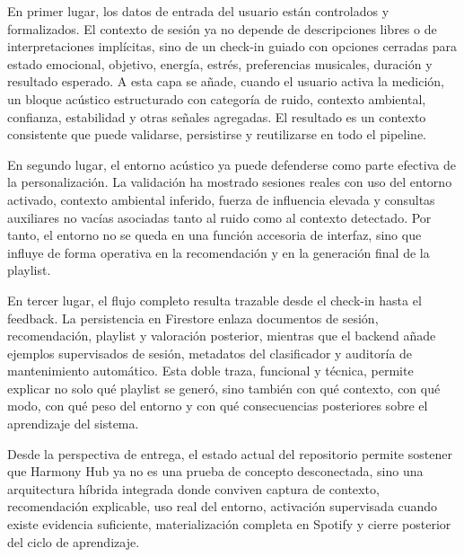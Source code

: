 En primer lugar, los datos de entrada del usuario están controlados y
formalizados. El contexto de sesión ya no depende de descripciones libres o de
interpretaciones implícitas, sino de un check-in guiado con opciones cerradas
para estado emocional, objetivo, energía, estrés, preferencias musicales,
duración y resultado esperado. A esta capa se añade, cuando el usuario activa
la medición, un bloque acústico estructurado con categoría de ruido, contexto
ambiental, confianza, estabilidad y otras señales agregadas. El resultado es un
contexto consistente que puede validarse, persistirse y reutilizarse en todo el
pipeline.

En segundo lugar, el entorno acústico ya puede defenderse como parte efectiva
de la personalización. La validación ha mostrado sesiones reales con uso del
entorno activado, contexto ambiental inferido, fuerza de influencia elevada y
consultas auxiliares no vacías asociadas tanto al ruido como al contexto
detectado. Por tanto, el entorno no se queda en una función accesoria de
interfaz, sino que influye de forma operativa en la recomendación y en la
generación final de la playlist.

En tercer lugar, el flujo completo resulta trazable desde el check-in hasta el
feedback. La persistencia en Firestore enlaza documentos de sesión,
recomendación, playlist y valoración posterior, mientras que el backend añade
ejemplos supervisados de sesión, metadatos del clasificador y auditoría de
mantenimiento automático. Esta doble traza, funcional y técnica, permite
explicar no solo qué playlist se generó, sino también con qué contexto, con qué
modo, con qué peso del entorno y con qué consecuencias posteriores sobre el
aprendizaje del sistema.

Desde la perspectiva de entrega, el estado actual del repositorio permite
sostener que Harmony Hub ya no es una prueba de concepto desconectada, sino una
arquitectura híbrida integrada donde conviven captura de contexto,
recomendación explicable, uso real del entorno, activación supervisada cuando
existe evidencia suficiente, materialización completa en Spotify y cierre
posterior del ciclo de aprendizaje.
